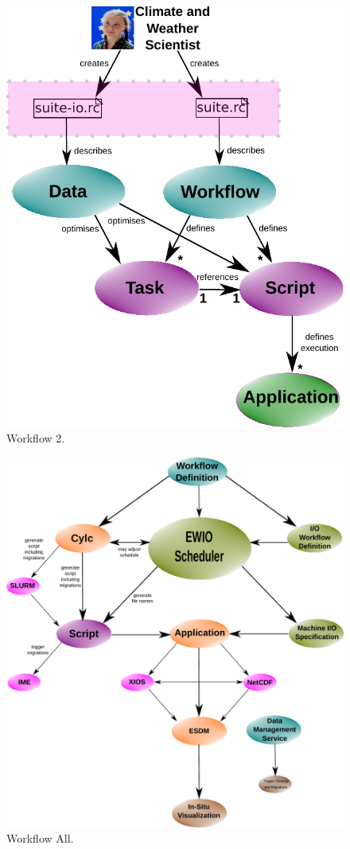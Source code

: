 \documentclass[a4paper]{article}
\begin{document}
\begin{figure}[H]
  \centering
  \includegraphics[scale=0.6]{workflow2-v2}
  \caption{Workflow 2.}
  \label{fig:work2}
\end{figure}

\begin{figure}[H]
  \centering
  \includegraphics[scale=0.6]{workflow-all}
  \caption{Workflow All.}
  \label{fig:work}
\end{figure}
\end{document}
